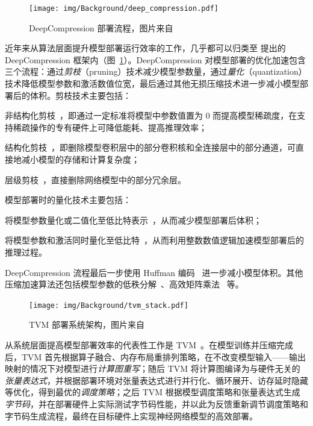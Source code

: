 \documentclass[
  fontset = mac,
]{shtthesis}
\begin{document}
\begin{figure}[htb]
  \centering
  \texttt{[image: img/Background/deep\_compression.pdf]}
  \caption{DeepCompression 部署流程，图片来自~\citet{han2015deep}}
  \label{img::background::deep_compression}
\end{figure}

近年来从算法层面提升模型部署运行效率的工作，几乎都可以归类至 \citet{han2015deep, han2017efficient} 提出的 DeepCompression 框架内（图~\ref{img::background::deep_compression}）。DeepCompression 对模型部署的优化加速包含三个流程：通过\emph{剪枝}（pruning）技术减少模型参数量，通过\emph{量化}（quantization）技术降低模型参数和激活数值位宽，最后通过其他无损压缩技术进一步减小模型部署后的体积。剪枝技术主要包括：
{
  \setlist[enumerate]{}
  \begin{enumerate*}[1)]
    \item 非结构化剪枝~\citep{han2015learning}，即通过一定标准将模型中参数值置为 $0$ 而提高模型稀疏度，在支持稀疏操作的专有硬件上可降低能耗、提高推理效率；
    \item 结构化剪枝~\citep{li2016pruning}，即删除模型卷积层中的部分卷积核和全连接层中的部分通道，可直接地减小模型的存储和计算复杂度；
    \item 层级剪枝~\citep{chen2018shallowing}，直接删除网络模型中的部分冗余层。
  \end{enumerate*}
}
模型部署时的量化技术主要包括：
{
  \setlist[enumerate]{}
  \begin{enumerate*}[1)]
    \item 将模型参数量化或二值化至低比特表示~\citep{courbariaux2015binaryconnect, hou2018loss}，从而减少模型部署后体积；
    \item 将模型参数和激活同时量化至低比特~\citep{rastegari2016xnor, jacob2018quantization}，从而利用整数数值逻辑加速模型部署后的推理过程。
  \end{enumerate*}
}
DeepCompression 流程最后一步使用 Huffman 编码~\citep{van1976construction} 进一步减小模型体积。其他压缩加速算法还包括模型参数的低秩分解~\citep{sainath2013low}、高效矩阵乘法~\citep{lavin2016fast} 等。

\begin{figure}[htb]
  \centering
  \texttt{[image: img/Background/tvm\_stack.pdf]}
  \caption{TVM 部署系统架构，图片来自~\citet{chen2018tvm}}
  \label{img::background::tvm}
\end{figure}

从系统层面提高模型部署效率的代表性工作是 TVM~\citep{chen2018tvm}。在模型训练并压缩完成后，TVM 首先根据算子融合、内存布局重排列策略，在不改变模型输入——输出映射的情况下对模型进行\emph{计算图重写}；随后 TVM 将计算图编译为与硬件无关的\emph{张量表达式}，并根据部署环境对张量表达式进行并行化、循环展开、访存延时隐藏等优化，得到最优的\emph{调度策略}；之后 TVM 根据模型调度策略和张量表达式生成\emph{字节码}，并在部署硬件上实际测试字节码性能，并以此为反馈重新调节调度策略和字节码生成流程，最终在目标硬件上实现神经网络模型的高效部署。
\end{document}
